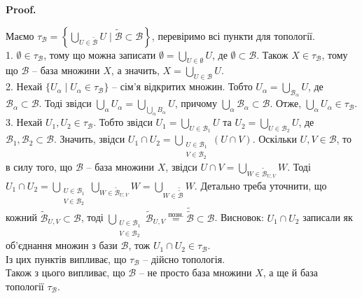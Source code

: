 \documentclass[a4paper, 10pt]{article}
\makeatletter
\theoremstyle{theoremdd}
\renewenvironment{proof}[1][Proof.\\]{\par
\pushQED{\hfill \qed}%
\normalfont \topsep6\p@\@plus6\p@\relax
\trivlist
\item\relax
{\bfseries
#1\@addpunct{.}}\hspace\labelsep\ignorespaces
}{%
\popQED\endtrivlist\@endpefalse
}
\makeatother
\begin{document}
\begin{proof}
Маємо $\tau_{\mathcal{B}} = \left\{ \displaystyle\bigcup_{U \in \mathcal{\mathcal{\tilde{B}}}} U \mid \mathcal{\tilde{B}} \subset \mathcal{B} \right\}$, перевіримо всі пункти для топології.\\
1. $\emptyset \in \tau_{\mathcal{B}}$, тому що можна записати $\emptyset = \displaystyle\bigcup_{U \in \emptyset} U$, де $\emptyset \subset \mathcal{B}$. Також $X \in \tau_{\mathcal{B}}$, тому що $\mathcal{B}$ -- база множини $X$, а значить, $X = \displaystyle\bigcup_{U \in \mathcal{B}} U$.\\
2. Нехай $\{U_\alpha \mid U_\alpha \in \tau_{\mathcal{B}}\}$ -- сім'я відкритих множин. Тобто $U_\alpha = \displaystyle\bigcup_{\mathcal{B}_\alpha} U$, де $\mathcal{B}_\alpha \subset \mathcal{B}$. Тоді звідси $\displaystyle\bigcup_\alpha U_\alpha = \bigcup_{\bigcup_\alpha B_\alpha} U$, причому $\displaystyle\bigcup_\alpha \mathcal{B}_\alpha \subset \mathcal{B}$. Отже, $\displaystyle\bigcup_\alpha U_\alpha \in \tau_\mathcal{B}$.\\
3. Нехай $U_1,U_2 \in \tau_\mathcal{B}$. Тобто звідси $U_1 = \displaystyle\bigcup_{U \in \mathcal{B}_1} U$ та $U_2 = \displaystyle\bigcup_{U \in \mathcal{B}_2} U$, де $\mathcal{B}_1,\mathcal{B}_2 \subset \mathcal{B}$. Значить, звідси $U_1 \cap U_2 = \displaystyle\bigcup_{\substack{U \in \mathcal{B}_1 \\ V \in \mathcal{B}_2}} (U \cap V)$. Оскільки $U,V \in \mathcal{B}$, то в силу того, що $\mathcal{B}$ -- база множини $X$, звідси $U \cap V = \displaystyle\bigcup_{W \in \mathcal{\tilde{B}}_{U,V}} W$. Тоді $U_1 \cap U_2 = \displaystyle\bigcup_{\substack{U \in \mathcal{B}_1 \\ V \in \mathcal{B}_2}} \bigcup_{W \in \mathcal{\tilde{B}}_{U,V}} W = \displaystyle\bigcup_{W \in \mathcal{\tilde{\tilde{B}}}} W$. Детально треба уточнити, що кожний $\mathcal{\tilde{B}}_{U,V} \subset \mathcal{B}$, тоді $\displaystyle\bigcup_{\substack{U \in \mathcal{B}_1 \\ V \in \mathcal{B}_2}} \mathcal{\tilde{B}}_{U,V} \overset{\text{позн.}}{=} \mathcal{\tilde{\tilde{B}}} \subset \mathcal{B}$. Висновок: $U_1 \cap U_2$ записали як об'єднання множин з бази $\mathcal{B}$, тож $U_1 \cap U_2 \in \tau_{\mathcal{B}}$.\\
Із цих пунктів випливає, що $\tau_\mathcal{B}$ -- дійсно топологія.
\bigskip \\
Також з цього випливає, що $\mathcal{B}$ -- не просто база множини $X$, а ще й база топології $\tau_{\mathcal{B}}$.\\

\end{proof}
\end{document}
